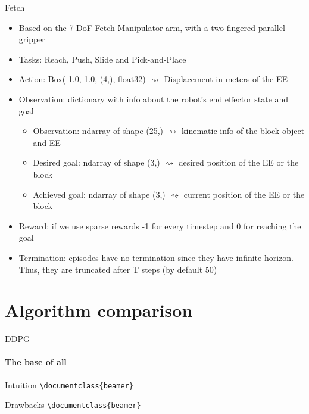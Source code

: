 \documentclass{beamer}
\begin{document}
      \begin{frame}{Fetch}
            \begin{itemize}
                  \item Based on the 7-DoF Fetch Manipulator arm, with a two-fingered parallel gripper
                  \item Tasks: Reach, Push, Slide and Pick-and-Place
                  \item Action: Box(-1.0, 1.0, (4,), float32) $\rightsquigarrow$ Displacement in meters of the EE 
                  \item Observation: dictionary with info about the robot’s end effector state and goal
                        \begin{itemize}
                              \item Observation: ndarray of shape (25,) $\rightsquigarrow$ kinematic info of the block object and EE
                              \item Desired goal: ndarray of shape (3,) $\rightsquigarrow$ desired position of the EE or the block
                              \item Achieved goal: ndarray of shape (3,) $\rightsquigarrow$ current position of the EE or the block
                        \end{itemize}
                  \item Reward: if we use sparse rewards -1 for every timestep and 0 for reaching the goal
                  \item Termination: episodes have no termination since they have infinite horizon. Thus, they are truncated after T steps (by default 50)
            \end{itemize}
      \end{frame}

\section{Algorithm comparison}

      \begin{frame}[fragile]{DDPG}
            \framesubtitle{The base of all}
            \begin{block}{Intuition}
                  \verb|\documentclass{beamer}|\\
            \end{block}
            \begin{block}{Drawbacks}
                  \verb|\documentclass{beamer}|\\
            \end{block}
      \end{frame}
\end{document}
